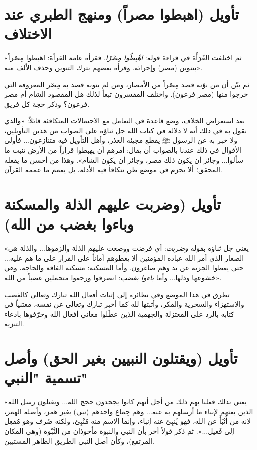 \separator

\section{تأويل (اهبطوا مصراً) ومنهج الطبري عند الاختلاف}
 «ثم اختلفت القَرَأَة في قراءة قوله: \textit{اهْبِطُوا مِصْرًا}. فقرأه عامة القرأة: اهبطوا مِصْراً بتنوين (مصر) وإجرائه. وقرأه بعضهم بترك التنوين وحذف الألف منه».

ثم بيّن  أن من نوّنه قصد مِصْراً من الأمصار، ومن لم ينونه قصد به مِصْر المعروفة التي خرجوا منها (مصر فرعون). واختلف المفسرون تبعاً لذلك هل المقصود الشام أم مصر فرعون؟ وذكر حجة كل فريق.

\begin{fawaid}
بعد استعراض الخلاف، وضع  قاعدة في التعامل مع الاحتمالات المتكافئة قائلاً: «والذي نقول به في ذلك أنه لا دلالة في كتاب الله جل ثناؤه على الصواب من هذين التأويلين، ولا خبر به عن الرسول ﷺ يقطع مجيئه العذر، وأهل التأويل فيه متنازعون... فأولى الأقوال في ذلك عندنا بالصواب أن يقال: أمرهم أن يهبطوا قراراً من الأرض تنبت ما سألوا... وجائز أن يكون ذلك مصر، وجائز أن يكون الشام». وهذا من أحسن ما يفعله المحقق؛ ألا يجزم في موضع ظن تتكافأ فيه الأدلة، بل يعمم ما عممه القرآن.
\end{fawaid}

\separator

\section{تأويل (وضربت عليهم الذلة والمسكنة وباءوا بغضب من الله)}
 «يعني جل ثناؤه بقوله \textit{وضربت}: أي فرضت ووضعت عليهم الذلة وألزموها... والذلة هي الصغار الذي أمر الله عباده المؤمنين ألا يعطوهم أماناً على القرار على ما هم عليه... حتى يعطوا الجزية عن يد وهم صاغرون. وأما المسكنة: مسكنة الفاقة والحاجة، وهي خشوعها وذلها... وأما \textit{باءوا بغضب}: انصرفوا ورجعوا متحملين غضباً من الله».

\begin{fawaid}
تطرق  في هذا الموضع وفي نظائره إلى إثبات أفعال الله تبارك وتعالى كالغضب والاستهزاء والسخرية والمكر، وأثبتها لله كما أخبر تبارك وتعالى عن نفسه، معتنياً في كتابه بالرد على المعتزلة والجهمية الذين عطّلوا معاني أفعال الله وحرّفوها بادعاء التنزيه.
\end{fawaid}

\separator

\section{تأويل (ويقتلون النبيين بغير الحق) وأصل تسمية "النبي"}
 «يعني بذلك فعلنا بهم ذلك من أجل أنهم كانوا يجحدون حجج الله... ويقتلون رسل الله الذين بعثهم لإنباء ما أرسلهم به عنه... وهم جِماع واحدهم (نبي) بغير همز، وأصله الهمز، لأنه من أَنْبَأَ عن الله، فهو يُنبِئ عنه إنباء، وإنما الاسم منه مُنْبِئ، ولكنه صُرف وهو مُفعِل إلى فَعيل...».
ثم ذكر قولاً آخر بأن النبي والنبوة مأخوذان من النَّبْوة (وهي المكان المرتفع)، وكأن أصل النبي الطريق الظاهر المستبين.


